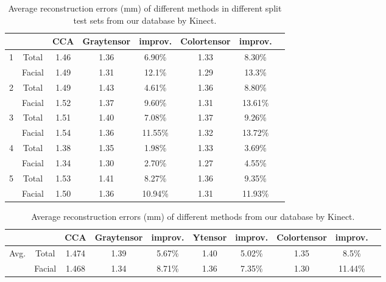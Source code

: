 \begin{table}[htbp]
\centering
\vfill 
\caption{Average reconstruction errors (mm) of different methods in different split test sets from our database by Kinect.}
\label{table:Re1}%
\begin{tabular}[b]{|l||c|c|c|c|c|c|c|}
\hline
 &  & CCA & Graytensor & improv.& Colortensor & improv. \\
\hline
\hline
 1  & Total  & 1.46 & 1.36 & 6.90\% & 1.33 & 8.30\%  \\   
    & Facial & 1.49 & 1.31 & 12.1\% & 1.29 & 13.3\%  \\ 

\hline
 2  & Total  & 1.49 & 1.43 & 4.61\% & 1.36 & 8.80\%  \\   
    & Facial & 1.52 & 1.37 & 9.60\% & 1.31 & 13.61\%  \\ 

\hline
 3  & Total  & 1.51 & 1.40 & 7.08\% & 1.37 & 9.26\%  \\   
    & Facial & 1.54 & 1.36 & 11.55\% & 1.32 & 13.72\%  \\ 


\hline
 4  & Total  & 1.38 & 1.35 & 1.98\% & 1.33 & 3.69\%  \\   
    & Facial & 1.34 & 1.30 & 2.70\% & 1.27 & 4.55\%  \\ 

\hline
 5  & Total  & 1.53 & 1.41 & 8.27\% & 1.36 & 9.35\%  \\   
    & Facial & 1.50 & 1.36 & 10.94\% & 1.31 & 11.93\%  \\ 

\hline
\end{tabular}%
\end{table}%

\begin{table}[htbp]
\centering
\vfill 
\caption{Average reconstruction errors (mm) of different methods from our database by Kinect.}
\label{table:Re1_2}%
\begin{tabular}[b]{|l||c|c|c|c|c|c|c|c|c|}

\hline
 &  & CCA & Graytensor & improv.& Ytensor & improv. &Colortensor & improv. \\
\hline
\hline
Avg. & Total  & 1.474 & 1.39 & 5.67\% & 1.40 & 5.02\% & 1.35 & 8.5\%  \\
     & Facial & 1.468 & 1.34 & 8.71\% & 1.36 & 7.35\% & 1.30 & 11.44\% \\
\hline

\end{tabular}
\end{table}%
